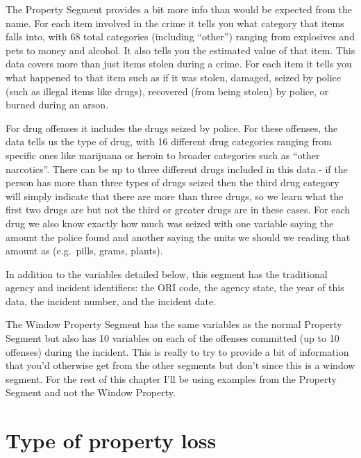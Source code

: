 \documentclass[
]{krantz}
\begin{document}
The Property Segment provides a bit more info than would be
expected from the name. For each item involved in the crime
it tells you what category that items falls into, with 68
total categories (including ``other'') ranging from
explosives and pets to money and alcohol. It also tells you
the estimated value of that item. This data covers more than
just items stolen during a crime. For each item it tells you
what happened to that item such as if it was stolen,
damaged, seized by police (such as illegal items like
drugs), recovered (from being stolen) by police, or burned
during an arson.

For drug offenses it includes the drugs seized by police.
For these offenses, the data tells us the type of drug, with
16 different drug categories ranging from specific ones like
marijuana or heroin to broader categories such as ``other
narcotics''. There can be up to three different drugs
included in this data - if the person has more than three
types of drugs seized then the third drug category will
simply indicate that there are more than three drugs, so we
learn what the first two drugs are but not the third or
greater drugs are in these cases. For each drug we also know
exactly how much was seized with one variable saying the
amount the police found and another saying the units we
should we reading that amount as (e.g.~pills, grams,
plants).

In addition to the variables detailed below, this segment
has the traditional agency and incident identifiers: the ORI
code, the agency state, the year of this data, the incident
number, and the incident date.

The Window Property Segment has the same variables as the
normal Property Segment but also has 10 variables on each of
the offenses committed (up to 10 offenses) during the
incident. This is really to try to provide a bit of
information that you'd otherwise get from the other segments
but don't since this is a window segment. For the rest of
this chapter I'll be using examples from the Property
Segment and not the Window Property.

\section{Type of property loss}\label{propertyLoss}
\end{document}
